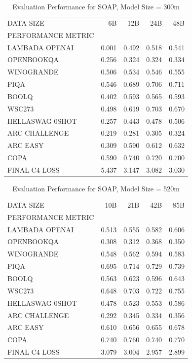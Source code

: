\begin{table}[H]
\centering
\caption{Evaluation Performance for SOAP, Model Size = 300m}
\label{tab:eval-performance-soap-300M}
\begin{tabular}{lrrrr}
\toprule
DATA SIZE & 6B & 12B & 24B & 48B \\
PERFORMANCE METRIC &  &  &  &  \\
\midrule
LAMBADA OPENAI & 0.001 & 0.492 & 0.518 & 0.541 \\
OPENBOOKQA & 0.256 & 0.324 & 0.324 & 0.334 \\
WINOGRANDE & 0.506 & 0.534 & 0.546 & 0.555 \\
PIQA & 0.546 & 0.689 & 0.706 & 0.711 \\
BOOLQ & 0.402 & 0.593 & 0.565 & 0.593 \\
WSC273 & 0.498 & 0.619 & 0.703 & 0.670 \\
HELLASWAG 0SHOT & 0.257 & 0.443 & 0.478 & 0.506 \\
ARC CHALLENGE & 0.219 & 0.281 & 0.305 & 0.324 \\
ARC EASY & 0.309 & 0.590 & 0.612 & 0.632 \\
COPA & 0.590 & 0.740 & 0.720 & 0.700 \\
FINAL C4 LOSS & 5.437 & 3.147 & 3.082 & 3.030 \\
\bottomrule
\end{tabular}
\end{table}


\begin{table}
[H] \centering \caption{Evaluation Performance for SOAP, Model Size = 520m}
\label{tab:eval-performance-soap-520M}
\begin{tabular}{lrrrr}
\toprule
DATA SIZE & 10B & 21B & 42B & 85B \\
PERFORMANCE METRIC &  &  &  &  \\
\midrule
LAMBADA OPENAI & 0.513 & 0.555 & 0.582 & 0.606 \\
OPENBOOKQA & 0.308 & 0.312 & 0.368 & 0.350 \\
WINOGRANDE & 0.548 & 0.562 & 0.594 & 0.583 \\
PIQA & 0.695 & 0.714 & 0.729 & 0.739 \\
BOOLQ & 0.563 & 0.623 & 0.596 & 0.643 \\
WSC273 & 0.648 & 0.703 & 0.722 & 0.755 \\
HELLASWAG 0SHOT & 0.478 & 0.523 & 0.553 & 0.586 \\
ARC CHALLENGE & 0.292 & 0.345 & 0.334 & 0.356 \\
ARC EASY & 0.610 & 0.656 & 0.655 & 0.678 \\
COPA & 0.740 & 0.760 & 0.740 & 0.770 \\
FINAL C4 LOSS & 3.079 & 3.004 & 2.957 & 2.899 \\
\bottomrule
\end{tabular}
\end{table}


